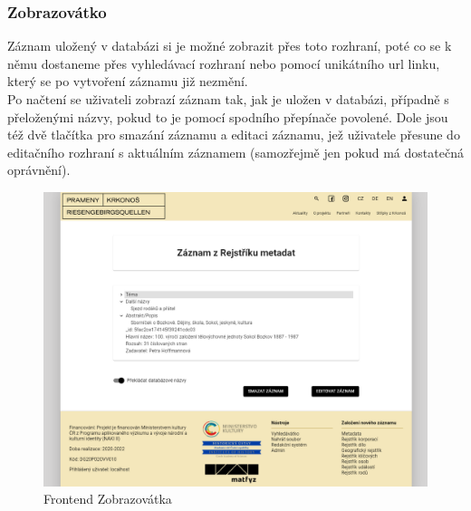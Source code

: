 \subsubsection{Zobrazovátko}
Záznam uložený v databázi si je možné zobrazit přes toto rozhraní, poté co
se k němu dostaneme přes vyhledávací rozhraní nebo pomocí unikátního
url linku, který se po vytvoření záznamu již nezmění.
\\
Po načtení se uživateli zobrazí záznam tak, jak je uložen v databázi, případně
s přeloženými názvy, pokud to je pomocí spodního přepínače povolené.
Dole jsou též dvě tlačítka pro smazání záznamu a editaci záznamu, jež uživatele
přesune do editačního rozhraní s aktuálním záznamem (samozřejmě jen pokud 
má dostatečná oprávnění).
\begin{figure}[H]
	\centering
	\includegraphics[width=.7\linewidth]{img/showScene.png}
	\caption{Frontend Zobrazovátka}
\end{figure}


